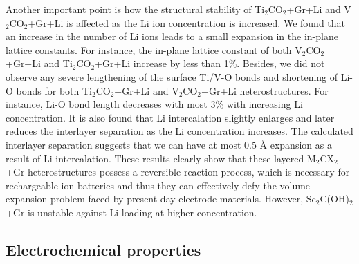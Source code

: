 Another important point is how the structural stability of Ti$_2$CO$_2$+Gr+Li and V$_2$CO$_2$+Gr+Li is affected as the Li ion concentration is increased. We found that an increase in the number of Li ions leads to a small expansion in the in-plane lattice constants.  For instance, the in-plane lattice constant of both V$_2$CO$_2$+Gr+Li and Ti$_2$CO$_2$+Gr+Li increase by less than 1\%.   Besides, we did not observe any  severe  lengthening of the surface Ti/V-O bonds and
shortening of Li-O bonds for both Ti$_2$CO$_2$+Gr+Li and V$_2$CO$_2$+Gr+Li heterostructures. For instance,
Li-O bond length decreases with most 3\% with increasing Li concentration.   
It is also found that Li intercalation slightly enlarges and later reduces the interlayer separation as the Li concentration increases. The calculated interlayer separation suggests that we can have at most 0.5 {\AA} expansion as a result of Li intercalation. These results clearly show that these layered M$_2$CX$_2$+Gr heterostructures possess a reversible reaction process, which is necessary for rechargeable ion batteries and thus they can effectively defy the volume expansion problem faced by present day electrode materials. However, Sc$_2$C(OH)$_2$+Gr is unstable against Li loading at higher concentration. 



\subsection{Electrochemical properties}

